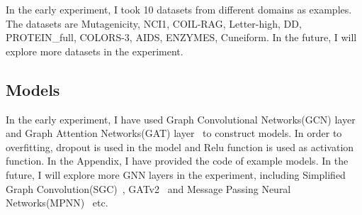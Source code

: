 \documentclass{article}
\begin{document}
In the early experiment, I took 10 datasets from different domains as examples. The datasets are Mutagenicity, NCI1, COIL-RAG, Letter-high, DD, PROTEIN\_full, COLORS-3, AIDS, ENZYMES, Cuneiform. In the future, I will explore more datasets in the experiment.

\subsection{Models}
In the early experiment, I have used Graph Convolutional Networks(GCN) layer~\cite{kipf2016semi} and Graph Attention Networks(GAT) layer~\cite{velickovic2020pointer} to construct models. In order to overfitting, dropout is used in the model and Relu function is used as activation function. In the Appendix, I have provided the code of example models. In the future, I will explore more GNN layers in the experiment, including Simplified Graph Convolution(SGC)~\cite{wu2019simplifying}, GATv2~\cite{brody2021attentive} and Message Passing Neural Networks(MPNN)~\cite{gilmer2017neural} etc.
\end{document}
